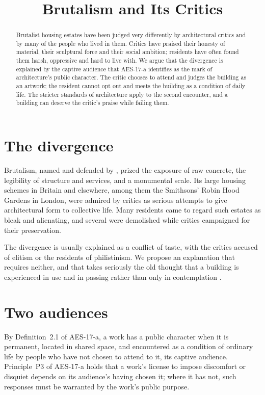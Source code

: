 \documentclass{situationist-preprint}
\title{Brutalism and Its Critics}
\begin{document}
\maketitle

\begin{abstract}
Brutalist housing estates have been judged very differently by architectural critics and by many of the people who lived in them. Critics have praised their honesty of material, their sculptural force and their social ambition; residents have often found them harsh, oppressive and hard to live with. We argue that the divergence is explained by the captive audience that AES-17-a identifies as the mark of architecture's public character. The critic chooses to attend and judges the building as an artwork; the resident cannot opt out and meets the building as a condition of daily life. The stricter standards of architecture apply to the second encounter, and a building can deserve the critic's praise while failing them.
\end{abstract}

\section{The divergence}

Brutalism, named and defended by \citet{Banham1966}, prized the exposure of raw concrete, the legibility of structure and services, and a monumental scale. Its large housing schemes in Britain and elsewhere, among them the Smithsons' Robin Hood Gardens in London, were admired by critics as serious attempts to give architectural form to collective life. Many residents came to regard such estates as bleak and alienating, and several were demolished while critics campaigned for their preservation.

The divergence is usually explained as a conflict of taste, with the critics accused of elitism or the residents of philistinism. We propose an explanation that requires neither, and that takes seriously the old thought that a building is experienced in use and in passing rather than only in contemplation \citep{Scruton1979}.

\section{Two audiences}

By Definition~2.1 of AES-17-a, a work has a public character when it is permanent, located in shared space, and encountered as a condition of ordinary life by people who have not chosen to attend to it, its captive audience. Principle~P3 of AES-17-a holds that a work's license to impose discomfort or disquiet depends on its audience's having chosen it; where it has not, such responses must be warranted by the work's public purpose.
\end{document}
